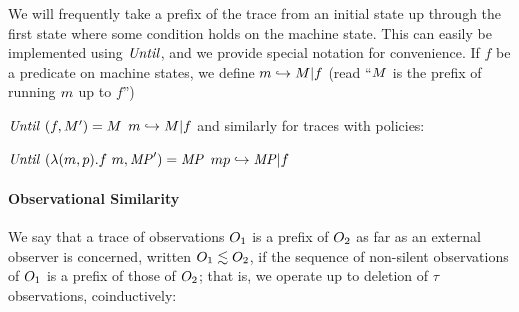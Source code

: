 \documentclass[acmsmall,review,anonymous]{acmart}\settopmatter{printfolios=true,printccs=false,printacmref=false}
\begin{document}
{We will frequently take a prefix of the trace from an initial state up
through the first state where some condition holds on the machine state.
This can easily be implemented using \(\mathit{Until}\), and we provide special notation
for convenience.
%
If \(f\) be a predicate on machine states, we define \(m
\hookrightarrow M | f\) (read ``\(M\) is the prefix of
running \(m\) up to \(f\)'')

            {\(\mathit{Until}~(f,M')
              = M\)}
            {\(m \hookrightarrow M | f\)}
\noindent
and similarly for traces with policies:

            {\(\mathit{Until}~(\lambda (m,p).f\ m,\mathit{MP}') = \mathit{MP}\)}
         {\(mp \hookrightarrow \mathit{MP} | f\)}


\paragraph*{Observational Similarity}

We say that a trace of observations $O_1$ is a prefix of $O_2$
as far as an external observer is concerned, written \(O_1 \lesssim
O_2\), if the sequence of
non-silent observations of $O_1$ is a prefix of those of
$O_2$; that is, we operate up to deletion of \(\tau\) observations,
coinductively:

\begin{minipage}{.3\textwidth}
  \judgment{}{\(\obsT \lesssim \obsT\)}
\end{minipage}
\begin{minipage}{.3\textwidth}
\judgment{}{\(\tau \lesssim \obsT\)}
\end{minipage}
\begin{minipage}{.3\textwidth}
\end{minipage}

}
\end{document}
